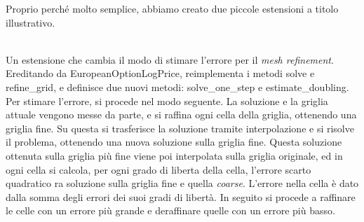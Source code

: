 \documentclass[a4paper,10pt]{report}
\theoremstyle{plain}
\theoremstyle{definition}
\theoremstyle{remark}
\begin{document}
Proprio perché molto semplice, abbiamo creato due piccole estensioni a titolo illustrativo.
\begin{description}[leftmargin=0cm]
 \item[\bf doubling\_extension] \hfill \\ Un estensione che cambia il modo di stimare l'errore per il \emph{mesh refinement}. Ereditando da \textsf{EuropeanOptionLogPrice}, reimplementa i metodi \textsf{solve} e \textsf{refine\_grid}, e definisce due nuovi metodi: \textsf{solve\_one\_step} e \textsf{estimate\_doubling}. Per stimare l'errore, si procede nel modo seguente. La soluzione e la griglia attuale vengono messe da parte, e si raffina ogni cella della griglia, ottenendo una griglia fine. Su questa si trasferisce la soluzione tramite interpolazione e si risolve il problema, ottenendo una nuova soluzione sulla griglia fine. Questa soluzione ottenuta sulla griglia più fine viene poi interpolata sulla griglia originale, ed in ogni cella si calcola, per ogni grado di liberta della cella, l'errore scarto quadratico ra soluzione sulla griglia fine e quella \emph{coarse}. L'errore nella cella è dato dalla somma degli errori dei suoi gradi di libertà. In seguito si procede a raffinare le celle con un errore pi\`u grande e deraffinare quelle con un errore pi\`u basso. 
 

\end{description}
\end{document}
